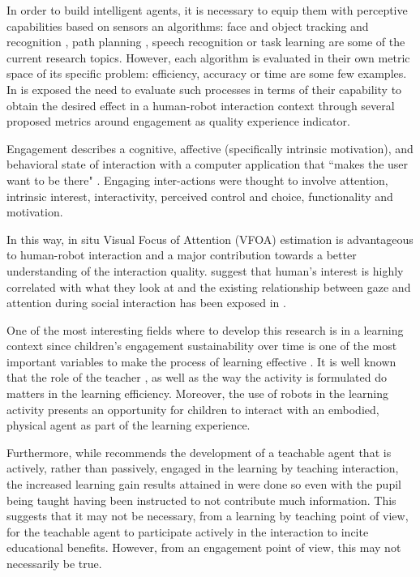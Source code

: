 \documentclass{sig-alternate}
\begin{document}
In order to build intelligent agents, it is necessary to equip them with perceptive capabilities based on sensors an algorithms: face and object tracking and recognition \cite{Zhao:2003, Jafri:2014}, path planning \cite{Galceran:2013}, speech recognition \cite{brick2007incremental} or task learning \cite{calinon2007learning} are some of the current research topics. However, each algorithm is evaluated in their own metric space of its specific problem: efficiency, accuracy or time are some few examples. In \cite{anzalone} is exposed the need to evaluate such processes in terms of their capability to obtain the desired effect in a human-robot interaction context through several proposed metrics around engagement as quality experience indicator.

Engagement describes a cognitive, affective (specifically intrinsic motivation), and behavioral state of interaction with a computer application that ``makes the user want to be there" \cite{OBrien:2010}. Engaging inter-actions were thought to involve attention, intrinsic interest, interactivity, perceived control and choice, functionality and motivation.

In this way, in situ Visual Focus of Attention (VFOA) estimation is advantageous to human-robot interaction and a major contribution towards a better understanding of the interaction quality. \cite{yarbus1967eye, barber1976perception} suggest that human's interest is highly correlated with what they look at and the existing relationship between gaze and attention during social interaction has been exposed in \cite{argyle1969social}.

One of the most interesting fields where to develop this research is in a learning context since children's engagement sustainability over time is one of the most important variables to make
the process of learning effective \cite{Umbach}. It is well known that the role of the teacher \cite{smith2005pedagogies}, as well as the way the activity is formulated do matters in the learning efficiency. Moreover, the use of robots in the learning activity presents an opportunity for children
to interact with an embodied, physical agent as part of the learning experience. 

Furthermore, while \cite{zhao2012learning} recommends the development of a teachable agent that is actively, rather than passively, engaged in the learning by teaching interaction, the increased learning gain results attained in \cite{okita2006observation} were done so even with the pupil being taught having been instructed to not contribute much information. This suggests that it may not be necessary, from a learning by teaching point of view, for the teachable agent to participate actively in the interaction to incite educational benefits. However, from an engagement point of view, this may not necessarily be true.
\end{document}
